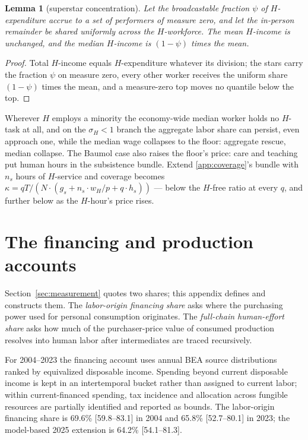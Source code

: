 \documentclass[12pt]{article}
\theoremstyle{plain}
\newtheorem{lemma}[proposition]{Lemma}
\begin{document}
\begin{lemma}[superstar concentration]\label{lem:superstar}
Let the broadcastable fraction $\psi$ of $H$-expenditure accrue to a set of performers of measure zero, and let the in-person remainder be shared uniformly across the $H$-workforce. The mean $H$-income is unchanged, and the median $H$-income is $(1-\psi )$ times the mean.
\end{lemma}

\begin{proof}
Total $H$-income equals $H$-expenditure whatever its division; the stars carry the fraction $\psi$ on measure zero, every other worker receives the uniform share $(1-\psi )$ times the mean, and a measure-zero top moves no quantile below the top.
\end{proof}

Wherever $H$ employs a minority the economy-wide median worker holds no $H$-task at all, and on the $\sigma _H < 1$ branch the aggregate labor share can persist, even approach one, while the median wage collapses to the floor: aggregate rescue, median collapse. The Baumol case also raises the floor's price: care and teaching put human hours in the subsistence bundle. Extend \ref{app:coverage}'s bundle with $n_s$ hours of $H$-service and coverage becomes $\kappa = qT/(N\cdot (g_s + n_s\cdot w_H/p + q\cdot h_s))$ --- below the $H$-free ratio at every $q$, and further below as the $H$-hour's price rises.

\section{The financing and production accounts}\label{app:effort}

Section~\ref{sec:measurement} quotes two shares; this appendix defines and constructs them. The \emph{labor-origin financing share} asks where the purchasing power used for personal consumption originates. The \emph{full-chain human-effort share} asks how much of the purchaser-price value of consumed production resolves into human labor after intermediates are traced recursively.

For 2004--2023 the financing account uses annual BEA source distributions ranked by equivalized disposable income. Spending beyond current disposable income is kept in an intertemporal bucket rather than assigned to current labor; within current-financed spending, tax incidence and allocation across fungible resources are partially identified and reported as bounds. The labor-origin financing share is 69.6\% [59.8--83.1] in 2004 and 65.8\% [52.7--80.1] in 2023; the model-based 2025 extension is 64.2\% [54.1--81.3].
\end{document}
